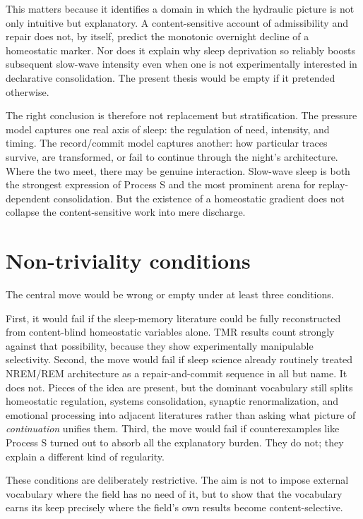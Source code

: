 \documentclass[11pt]{article}
\begin{document}
This matters because it identifies a domain in which the hydraulic picture is not only intuitive but explanatory. A content-sensitive account of admissibility and repair does not, by itself, predict the monotonic overnight decline of a homeostatic marker. Nor does it explain why sleep deprivation so reliably boosts subsequent slow-wave intensity even when one is not experimentally interested in declarative consolidation. The present thesis would be empty if it pretended otherwise.

The right conclusion is therefore not replacement but stratification. The pressure model captures one real axis of sleep: the regulation of need, intensity, and timing. The record/commit model captures another: how particular traces survive, are transformed, or fail to continue through the night's architecture. Where the two meet, there may be genuine interaction. Slow-wave sleep is both the strongest expression of Process S and the most prominent arena for replay-dependent consolidation. But the existence of a homeostatic gradient does not collapse the content-sensitive work into mere discharge.

\section{Non-triviality conditions}
The central move would be wrong or empty under at least three conditions.

First, it would fail if the sleep-memory literature could be fully reconstructed from content-blind homeostatic variables alone. TMR results count strongly against that possibility, because they show experimentally manipulable selectivity. Second, the move would fail if sleep science already routinely treated NREM/REM architecture as a repair-and-commit sequence in all but name. It does not. Pieces of the idea are present, but the dominant vocabulary still splits homeostatic regulation, systems consolidation, synaptic renormalization, and emotional processing into adjacent literatures rather than asking what picture of \emph{continuation} unifies them. Third, the move would fail if counterexamples like Process S turned out to absorb all the explanatory burden. They do not; they explain a different kind of regularity.

These conditions are deliberately restrictive. The aim is not to impose external vocabulary where the field has no need of it, but to show that the vocabulary earns its keep precisely where the field's own results become content-selective.
\end{document}
